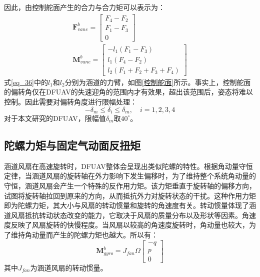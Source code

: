 因此，由控制舵面产生的合力与合力矩可以表示为\cite{pflimlinModelingAttitudeControl2010a,manzoorCompositeObserverbasedRobust2023}：
    \begin{gather}
    \boldsymbol{F}_{vane}^b=\begin{bmatrix}
    F_4-F_2 \\ F_1-F_3 \\ 0 
    \end{bmatrix}     \label{eq_35.5}\\
    \boldsymbol{M}_{vane}^b=\begin{bmatrix}
        -l_1(F_1-F_3) \\ l_1(F_4-F_2) \\ l_2(F_1+F_2+F_3+F_4) 
    \end{bmatrix}
    \label{eq_36}
    \end{gather}
式\eqref{eq_36}中的$l_1$和$l_2$分别为涵道的力臂，如图\ref{控制舵面}所示。事实上，控制舵面的偏转角仅在DFUAV的失速迎角的范围内才有效果\cite{9787121348440000}，超出该范围后，姿态将难以控制。因此需要对偏转角度进行限幅处理：
\begin{equation}
    -\delta_m\leq\delta_{i}\leq\delta_m,\quad i=1,2,3,4
    \label{eq_37}
\end{equation}
对于本文研究的DFUAV，限幅值$\delta_m$取$40^\circ$。

\subsection{陀螺力矩与固定气动面反扭矩}

涵道风扇在高速旋转时，DFUAV整体会呈现出类似陀螺的特性。根据角动量守恒定律，当涵道风扇的旋转轴在外力影响下发生偏移时，为了维持整个系统角动量的守恒，涵道风扇会产生一个特殊的反作用力矩。该力矩垂直于旋转轴的偏移方向，试图将旋转轴拉回到原来的方向，从而抵抗外力对旋转状态的干扰。这种作用力矩即为陀螺力矩，其大小与风扇的转动惯量和旋转的角速度有关。转动惯量体现了涵道风扇抵抗转动状态改变的能力，它取决于风扇的质量分布以及形状等因素。角速度反映了风扇旋转的快慢程度。当风扇以较高的角速度旋转时，角动量也较大，为了维持角动量而产生的陀螺力矩也越大。所以有：
\begin{equation}
    \boldsymbol{M}_{gyro}^b=J_{fan}\Omega
    \begin{bmatrix}
    -q \\ p \\ 0
    \end{bmatrix}
    \label{eq_38}
\end{equation}
其中$J_{fan}$为涵道风扇的转动惯量。

